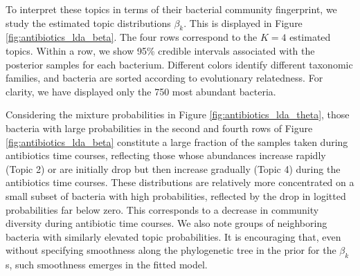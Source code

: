 \documentclass[oupdraft]{bio}
\begin{document}
To interpret these topics in terms of their bacterial community fingerprint, we
study the estimated topic distributions $\beta_{k}$. This is displayed in Figure
\ref{fig:antibiotics_lda_beta}. The four rows correspond to the $K = 4$
estimated topics. Within a row, we show 95\% credible intervals associated with
the posterior samples for each bacterium. Different colors identify different
taxonomic families, and bacteria are sorted according to evolutionary
relatedness. For clarity, we have displayed only the 750 most abundant bacteria.

Considering the mixture probabilities in Figure \ref{fig:antibiotics_lda_theta},
those bacteria with large probabilities in the second and fourth rows of Figure
\ref{fig:antibiotics_lda_beta} constitute a large fraction of the samples taken
during antibiotics time courses, reflecting those whose abundances increase
rapidly (Topic 2) or are initially drop but then increase gradually (Topic 4)
during the antibiotics time courses. These distributions are relatively more
concentrated on a small subset of bacteria with high probabilities, reflected by
the drop in logitted probabilities far below zero. This corresponds to a
decrease in community diversity during antibiotic time courses. We also note
groups of neighboring bacteria with similarly elevated topic probabilities. It
is encouraging that, even without specifying smoothness along the phylogenetic
tree in the prior for the $\beta_{k}$s, such smoothness emerges in the fitted
model.
\end{document}
